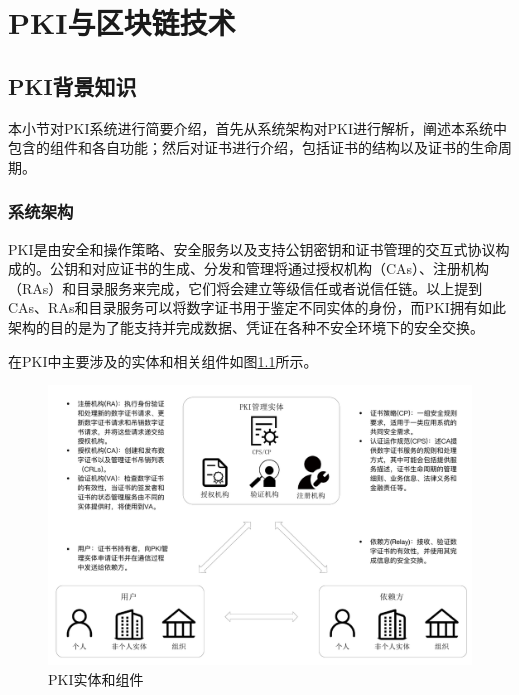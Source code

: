
\chapter{PKI与区块链技术}



\section{PKI背景知识}


本小节对PKI系统进行简要介绍，首先从系统架构对PKI进行解析，阐述本系统中包含的组件和各自功能；然后对证书进行介绍，包括证书的结构以及证书的生命周期。

\subsection{系统架构}


PKI是由安全和操作策略、安全服务以及支持公钥密钥和证书管理的交互式协议构成的。公钥和对应证书的生成、分发和管理将通过授权机构（CAs）、注册机构（RAs）和目录服务来完成\cite{weise2001public}，它们将会建立等级信任或者说信任链。以上提到CAs、RAs和目录服务可以将数字证书用于鉴定不同实体的身份，而PKI拥有如此架构的目的是为了能支持并完成数据、凭证在各种不安全环境下的安全交换。

在PKI中主要涉及的实体和相关组件如图\ref{fig:pki}所示。

\begin{figure}[htbp]
 	\centering
 	\includegraphics[width = 1\textwidth]{img/pki}
 	\caption{PKI实体和组件}\label{fig:pki}
\end{figure}



